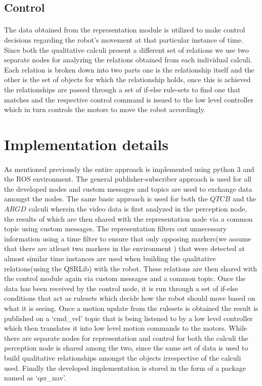 \subsection{Control}
\paragraph{} The data obtained from the representation module is utilized to make control decisions regarding the robot's movement at that particular instance of time. Since both the qualitative calculi present a different set of relations we use two separate nodes for analyzing the relations obtained from each individual calculi. Each relation is broken down into two parts one is the relationship itself and the other is the set of objects for which the relationship holds, once this is achieved the relationships are passed through a set of if-else rule-sets to find one that matches and the respective control command is issued to the low level controller which in turn controls the motors to move the robot accordingly. 

\section{Implementation details}
\paragraph{} As mentioned previously the entire approach is implemented using python 3 and the ROS environment. The general publisher-subscriber approach is used for all the developed nodes and custom messages and topics are used to exchange data amongst the nodes. The same basic approach is used for both the $QTCB$ and the $ARGD$ calculi wherein the video data is first analyzed in the perception node, the results of which are then shared with the representation node via a common topic using custom messages. The representation filters out unnecessary information using a time filter to ensure that only opposing markers(we assume that there are atleast two markers in the environment ) that were detected at almost similar time instances are used when building the qualitative relations(using the QSRLib) with the robot. These relations are then shared with the control module again via custom messages and a common topic. Once the data has been received by the control node, it is run through a set of if-else conditions that act as rulesets which decide how the robot should move based on what it is seeing. Once a motion update from the rulesets is obtained the result is published on a `cmd\_vel' topic that is being listened to by a low level controller which then translates it into low level motion commands to the motors. While there are separate nodes for representation and control for both the calculi the perception node is shared among the two, since the same set of data is used to build qualitative relationships amongst the objects irrespective of the calculi used. Finally the developed implementation is stored in the form of a package named as `qsr\_nav'.

